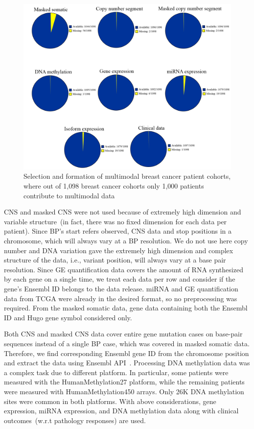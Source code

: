 \begin{figure}
  \centering
  \includegraphics[scale=0.55]{images/data_per_patients}
  \caption[Selection and formation of multimodal breast cancer patient cohorts]{Selection and formation of multimodal breast cancer patient cohorts, where out of 1,098 breast cancer cohorts only 1,000 patients  contribute to multimodal data }
  \label{fig:data_per_patients}
\end{figure}

\hspace*{3.5mm} CNS and masked CNS were not used because of extremely high dimension and variable structure~(in fact, there was no fixed dimension for each data per patient). Since BP's start refers observed, CNS data and stop positions in a chromosome, which will always vary at a BP resolution. We do not use here copy number and DNA variation gave the extremely high dimension and complex structure of the data, i.e., variant position, will always vary at a base pair resolution. Since GE quantification data covers the amount of RNA synthesized by each gene on a single time, we treat each data per row and consider if the gene's Ensembl ID belongs to the data release. miRNA and GE quantification data from TCGA were already in the desired format, so no preprocessing was required. From the masked somatic data, gene data containing both the Ensembl ID and Hugo gene symbol considered only. 

\hspace*{3.5mm} Both CNS and masked CNS data cover entire gene mutation cases on base-pair sequences instead of a single BP case, which was covered in masked somatic data. Therefore, we find corresponding Ensembl gene ID from the chromosome position and extract the data using Ensembl API~\cite{yates}. Processing DNA methylation data was a complex task due to different platform. In particular, some patients were measured with the HumanMethylation27 platform, while the remaining patients were measured with HumanMethylation450 arrays. Only 26K DNA methylation sites were common in both platforms. With above considerations, gene expression, miRNA expression, and DNA methylation data along with clinical outcomes~(w.r.t pathology responses) are used. 


